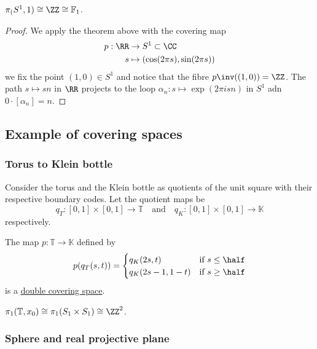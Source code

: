 \documentclass[12pt, a4paper]{article}
\begin{document}
\begin{mdcor}
    \(\pi_(S^1,1) \cong \ZZ \cong \mathbb{F}_1\).
\end{mdcor}

\begin{proof}
    We apply the theorem above with the covering map 
    \[\begin{aligned}
        p:\RR &\to S^1 \subset \CC \\
        s &\mapsto (\cos(2\pi s),\sin(2\pi s))
    \end{aligned}\]
    we fix the point \((1,0) \in S^1\) and notice that the fibre \(p\inv((1,0))=\ZZ\). The path \(s\mapsto sn\) in \(\RR\) projects to the loop \(\alpha_n :s \mapsto \exp(2\pi isn )\) in \(S^1\) adn \(0\cdot [\alpha_n]=n\).
\end{proof}

\subsection{Example of covering spaces}

\subsubsection{Torus to Klein bottle}

\begin{mdprop}
Consider the torus and the Klein bottle as quotients of the unit square with their respective boundary codes. Let the quotient maps be 
\[q_T :[0,1] \times [0,1] \to \mathbb{T} \quad \text{and} \quad q_K :[0,1] \times [0,1] \to \mathbb{K}\]
respectively.

The map \(p:\mathbb{T} \to \mathbb{K}\) defined by 
    \[p(q_T(s,t))= \begin{cases}
        q_K(2s,t) &\text{if } s\leq \half \\
        q_K(2s-1,1-t) &\text{if } s\geq \half
    \end{cases}\]
    is a \ul{double covering space}.
\end{mdprop}

\begin{mdprop}
    \(\pi_1(\mathbb{T},x_0) \cong \pi_1(S_1\times S_1)\cong \ZZ^2\).
\end{mdprop}

\subsubsection{Sphere and real projective plane}
\end{document}

